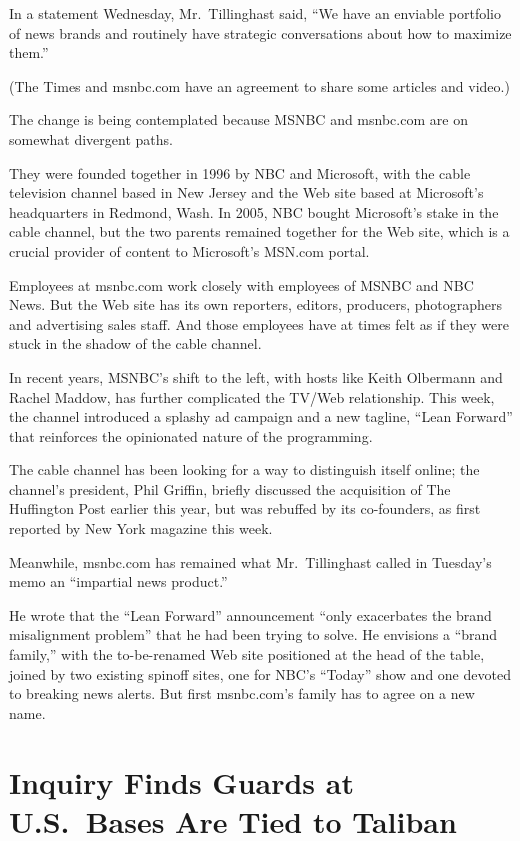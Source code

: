 ﻿\documentclass[12pt]{article}
\begin{document}
In a statement Wednesday, Mr.~Tillinghast said, ``We have an enviable portfolio of news brands and
routinely have strategic conversations about how to maximize them.''

(The Times and msnbc.com have an agreement to share some articles and video.)

The change is being contemplated because MSNBC and msnbc.com are on somewhat divergent paths.

They were founded together in 1996 by NBC and Microsoft, with the cable television channel based in
New Jersey and the Web site based at Microsoft's headquarters in Redmond, Wash. In 2005, NBC bought
Microsoft's stake in the cable channel, but the two parents remained together for the Web site,
which is a crucial provider of content to Microsoft's MSN.com portal.

Employees at msnbc.com work closely with employees of MSNBC and NBC News. But the Web site has its
own reporters, editors, producers, photographers and advertising sales staff. And those employees
have at times felt as if they were stuck in the shadow of the cable channel.

In recent years, MSNBC's shift to the left, with hosts like Keith Olbermann and Rachel Maddow, has
further complicated the TV/Web relationship. This week, the channel introduced a splashy ad campaign
and a new tagline, ``Lean Forward'' that reinforces the opinionated nature of the programming.

The cable channel has been looking for a way to distinguish itself online; the channel's president,
Phil Griffin, briefly discussed the acquisition of The Huffington Post earlier this year, but was
rebuffed by its co-founders, as first reported by New York magazine this week.

Meanwhile, msnbc.com has remained what Mr.~Tillinghast called in Tuesday's memo an ``impartial news
product.''

He wrote that the ``Lean Forward'' announcement ``only exacerbates the brand misalignment problem''
that he had been trying to solve. He envisions a ``brand family,'' with the to-be-renamed Web site
positioned at the head of the table, joined by two existing spinoff sites, one for NBC's ``Today''
show and one devoted to breaking news alerts. But first msnbc.com's family has to agree on a new
name.

\section{Inquiry Finds Guards at U.S.~Bases Are Tied to Taliban}
\end{document}
